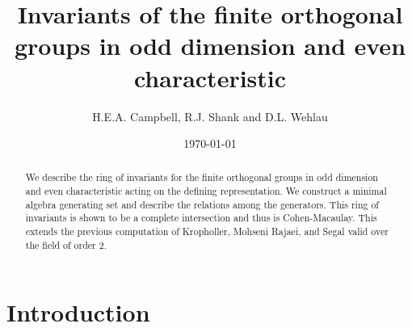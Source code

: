 \documentclass{amsart}
\title[Invariants of $\text{O}_{2m+1}(\mathbb{F}_{2^s})$]{Invariants of the finite orthogonal groups in odd dimension and even characteristic}
\author{H.E.A. Campbell, R.J. Shank and D.L. Wehlau}
\date{\today}
\begin{document}
\begin{abstract}
    We describe the ring of invariants for the finite orthogonal groups
in odd dimension and even characteristic acting on the defining representation.  
We construct a minimal algebra generating set and describe the relations among the generators.  This ring of invariants is shown to be 
a complete intersection and thus is
Cohen-Macaulay.  
This extends the previous computation 
of Kropholler, Mohseni Rajaei, and Segal
valid over the field of order 2.
\end{abstract}


\maketitle
\tableofcontents


\section{Introduction}
\end{document}
